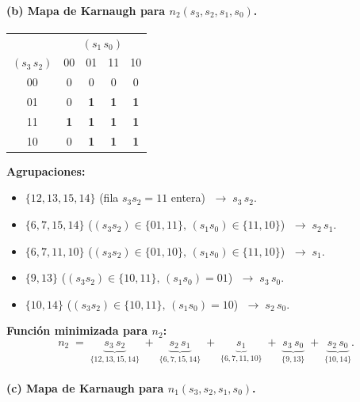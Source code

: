 \documentclass[12pt]{article}
\begin{document}
\bigskip

\paragraph*{(b) Mapa de Karnaugh para \(n_{2}(s_{3},s_{2},s_{1},s_{0})\).}

\begin{center}
\begin{tabular}{c|cccc}
  \multicolumn{1}{c}{} & \multicolumn{4}{c}{\((s_{1}\,s_{0})\)} \\[-2pt]
  \cline{2-5}
  \((s_{3}\,s_{2})\) & 00 & 01 & 11 & 10 \\
  \cline{1-5}
  00 & 0 & 0 & 0 & 0 \\ 
  01 & 0 & \bf1 & \bf1 & \bf1 \\ %
  11 & \bf1 & \bf1 & \bf1 & \bf1 \\%
  10 & 0 & \bf1 & \bf1 & \bf1 \\ %
  \cline{1-5}
\end{tabular}
\end{center}

\noindent
\textbf{Agrupaciones:}
\begin{itemize}
  \item \(\{12,13,15,14\}\) (fila \(s_{3}s_{2}=11\) entera)  
    \(\;\longrightarrow\; s_{3}\,s_{2}.\)
  \item \(\{6,7,15,14\}\) (\((s_{3}s_{2})\in\{01,11\},\,(s_{1}s_{0})\in\{11,10\}\))  
    \(\;\longrightarrow\; s_{2}\,s_{1}.\)
  \item \(\{6,7,11,10\}\) (\((s_{3}s_{2})\in\{01,10\},\,(s_{1}s_{0})\in\{11,10\}\))  
    \(\;\longrightarrow\; s_{1}.\)
  \item \(\{9,13\}\) (\((s_{3}s_{2})\in\{10,11\},\,(s_{1}s_{0})=01\))  
    \(\;\longrightarrow\; s_{3}\,s_{0}.\)
  \item \(\{10,14\}\) (\((s_{3}s_{2})\in\{10,11\},\,(s_{1}s_{0})=10\))  
    \(\;\longrightarrow\; s_{2}\,s_{0}.\)
\end{itemize}

\noindent
\textbf{Función minimizada para \(n_{2}\):}
\[
  n_{2} \;=\; 
    \underbrace{s_{3}\,s_{2}}_{\{12,13,15,14\}} 
    \;+\; 
    \underbrace{s_{2}\,s_{1}}_{\{6,7,15,14\}} 
    \;+\; 
    \underbrace{s_{1}}_{\{6,7,11,10\}} 
    \;+\; 
    \underbrace{s_{3}\,s_{0}}_{\{9,13\}} 
    \;+\; 
    \underbrace{s_{2}\,s_{0}}_{\{10,14\}}.
\]

\bigskip

\paragraph*{(c) Mapa de Karnaugh para \(n_{1}(s_{3},s_{2},s_{1},s_{0})\).}
\end{document}
